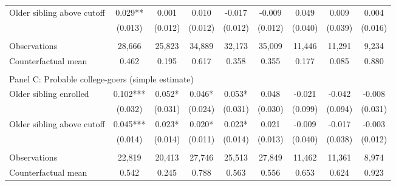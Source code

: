 {{\begin{tabular}{lcccccccc}
Older sibling above cutoff&       0.029** &       0.001   &       0.010   &      -0.017   &      -0.009   &       0.049   &       0.009   &       0.004   \\
                    &     (0.013)   &     (0.012)   &     (0.012)   &     (0.012)   &     (0.012)   &     (0.040)   &     (0.039)   &     (0.016)   \\
                    &               &               &               &               &               &               &               &               \\
Observations        &      28,666   &      25,823   &      34,889   &      32,173   &      35,009   &      11,446   &      11,291   &       9,234   \\
Counterfactual mean &       0.462   &       0.195   &       0.617   &       0.358   &       0.355   &       0.177   &       0.085   &       0.880   \\
 
&  &  &  & & & & & & \\
\multicolumn{9}{l}{Panel C: Probable college-goers (simple estimate)} \\
Older sibling enrolled&       0.102***&       0.052*  &       0.046*  &       0.053*  &       0.048   &      -0.021   &      -0.042   &      -0.008   \\
                    &     (0.032)   &     (0.031)   &     (0.024)   &     (0.031)   &     (0.030)   &     (0.099)   &     (0.094)   &     (0.031)   \\
 
Older sibling above cutoff&       0.045***&       0.023*  &       0.020*  &       0.023*  &       0.021   &      -0.009   &      -0.017   &      -0.003   \\
                    &     (0.014)   &     (0.014)   &     (0.011)   &     (0.014)   &     (0.013)   &     (0.040)   &     (0.038)   &     (0.012)   \\
                    &               &               &               &               &               &               &               &               \\
Observations        &      22,819   &      20,413   &      27,746   &      25,513   &      27,849   &      11,462   &      11,361   &       8,974   \\
Counterfactual mean &       0.542   &       0.245   &       0.788   &       0.563   &       0.556   &       0.653   &       0.624   &       0.923   \\
 

    \bottomrule 
    \end{tabular}
    }
}